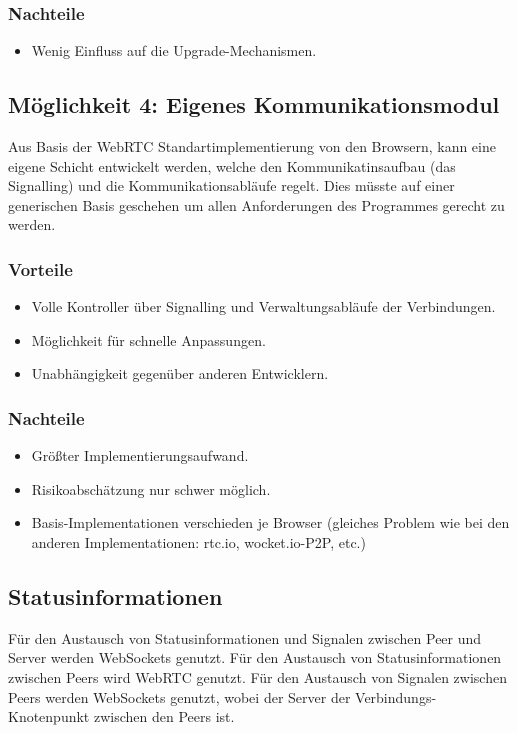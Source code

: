 \subsubsection{Nachteile}
\begin{itemize}
\item
Wenig Einfluss auf die Upgrade-Mechanismen.
\end{itemize}



\subsection{Möglichkeit 4: Eigenes Kommunikationsmodul}
Aus Basis der WebRTC Standartimplementierung von den Browsern, kann eine eigene Schicht entwickelt werden, welche den Kommunikatinsaufbau (das Signalling) und die Kommunikationsabläufe regelt. Dies müsste auf einer generischen Basis geschehen um allen Anforderungen des Programmes gerecht zu werden.

\subsubsection{Vorteile}
\begin{itemize}
\item
Volle Kontroller über Signalling und Verwaltungsabläufe der Verbindungen.

\item
Möglichkeit für schnelle Anpassungen.

\item
Unabhängigkeit gegenüber anderen Entwicklern.
\end{itemize}

\subsubsection{Nachteile}
\begin{itemize}
\item
Größter Implementierungsaufwand.

\item
Risikoabschätzung nur schwer möglich.

\item
Basis-Implementationen verschieden je Browser (gleiches Problem wie bei den anderen Implementationen: rtc.io, wocket.io-P2P, etc.)
\end{itemize}



\subsection{Statusinformationen}
Für den Austausch von Statusinformationen und Signalen zwischen Peer und Server werden WebSockets genutzt.
Für den Austausch von Statusinformationen zwischen Peers wird WebRTC genutzt.
Für den Austausch von Signalen zwischen Peers werden WebSockets genutzt, wobei der Server der Verbindungs-Knotenpunkt zwischen den Peers ist.



